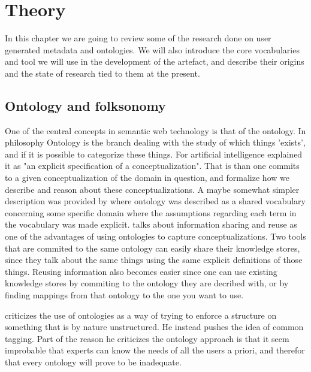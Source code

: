 
\chapter{Theory} %
\label{Theory} %

In this chapter we are going to review some of the research done on user generated metadata and ontologies.
We will also introduce the core vocabularies and tool we will use in the development of the artefact,
and describe their origins and the state of research tied to them at the present.

\section{Ontology and folksonomy}
One of the central concepts in semantic web technology is that of the ontology.
In philosophy Ontology is the branch dealing with the study of which things 'exists', and if it is possible to categorize these things.
For artificial intelligence \citet{Gruber1993} explained it as "an explicit specification of a conceptualization".
That is than one commits to a given conceptualization of the domain in question, and formalize how we describe and reason about these conceptualizations.
A maybe somewhat simpler description was provided by \citet{Guarino1998} where ontology was described as a shared vocabulary
concerning some specific domain where the assumptions regarding each term in the vocabulary was made explicit.
\citet{Pretorius2004} talks about information sharing and reuse as one of the advantages of using ontologies to
capture conceptualizations.
Two tools that are commited to the same ontology can easily share their knowledge stores,
since they talk about the same things using the same explicit definitions of those things.
Reusing information also becomes easier since one can use existing knowledge stores by commiting to the ontology they are
decribed with, or by finding mappings from that ontology to the one you want to use.


\citet{Shirky2007} criticizes the use of ontologies as a way of trying to enforce a structure on something that is by nature unstructured.
He instead pushes the idea of common tagging.
Part of the reason he criticizes the ontology approach is that it seem improbable that experts can know the needs of all the users a priori, and therefor that every ontology will prove to be inadequate.

